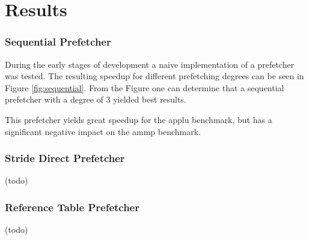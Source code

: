 \section{Results}
\label{sec:results}
%
\subsubsection{Sequential Prefetcher}
During the early stages of development a naive implementation of a prefetcher was tested.
The resulting speedup for different prefetching degrees can be seen in Figure \ref{fig:sequential}.
From the Figure one can determine that a sequential prefetcher with a degree of 3 yielded best results.

This prefetcher yields great speedup for the applu benchmark, but has a significant negative impact on the ammp benchmark.

\begin{figure*}
    \label{fig:sequential}
    
    \caption{Speedup of each benchmark as a function of degree for the sequential prefetcher.}
\end{figure*}



\subsubsection{Stride Direct Prefetcher}
(todo)

\subsubsection{Reference Table Prefetcher}
(todo)


